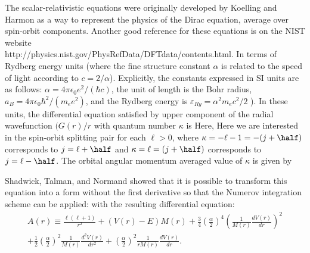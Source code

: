 \documentclass[11pt]{article}
\begin{document}

The scalar-relativistic equations were originally developed by Koelling and 
Harmon\cite{koelling:1977} as a way to represent the physics of the Dirac
equation, average over spin-orbit components. Another good reference for
these equations is on the NIST website\cite{levine:1997} \\
http://physics.nist.gov/PhysRefData/DFTdata/contents.html.   In terms of
Rydberg
energy units
(where the fine structure constant $\alpha$ is related to the speed of light
according to $c = 2/\alpha$).   Explicitly, the constants expressed
 in SI units are as follows: 
$\alpha=4 \pi \epsilon_0 e^2/(\hbar c)$, the unit of
length is the Bohr radius, $a_B= 4 \pi \epsilon_0 \hbar^2/(m_e e^2)$,
and the Rydberg energy is $\varepsilon_{Ry}= \alpha^2 m_e c^2/2$ ). 
In these units, the differential equation satisfied by 
upper component of the radial wavefunction $(G(r)/r$ with quantum number
$\kappa$ is
Here,
Here we are interested  in the spin-orbit splitting pair for each
$\ell > 0$, where $\kappa=-\ell-1=-(j+\half)$ corresponds to
$j=\ell+\half$ and $\kappa=\ell=(j+\half)$ corresponds to
$j=\ell-\half$.
The orbital angular momentum averaged value of  $\kappa$ is given by

Shadwick, Talman, and Normand\cite{talman:1989a} showed that it is possible to
transform this equation into a form without the first derivative so that the
Numerov integration scheme can be applied:
with the resulting differential equation:
\begin{eqnarray}
\displaystyle{A(r) \equiv \frac{\ell ( \ell + 1)}{r^2}
+ (V(r) - E) M(r) + \frac{3}{4} \left( \frac{\alpha}{2} \right)^4
\left( \frac{1}{M(r)} \frac{dV(r)}{dr} \right)^2} \\ \nonumber
\displaystyle{+ \frac{1}{2} 
\left( \frac{\alpha}{2} \right)^2 \frac{1}{M(r)} \frac{d^2 V(r)}{dr^2}
+ \left( \frac{\alpha}{2} \right)^2 \frac{1}{r M(r)} \frac{d V(r)}{dr}}.
\end{eqnarray}
\end{document}
